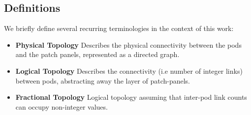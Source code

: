 \documentclass[sigconf]{acmart}
\theoremstyle{definition}
\begin{document}
\subsection{Definitions}
We briefly define several recurring terminologies in the context of this work:
\begin{itemize}
\vspace{-4pt}
    \item \textbf{Physical Topology} Describes the physical connectivity between the pods and the patch panels, represented as a directed graph.
    \item \textbf{Logical Topology} Describes the connectivity (i.e number of integer links) between pods, abstracting away the layer of patch-panels.
    \item \textbf{Fractional Topology} Logical topology assuming that inter-pod link counts can occupy non-integer values. 
\end{itemize}
\end{document}
